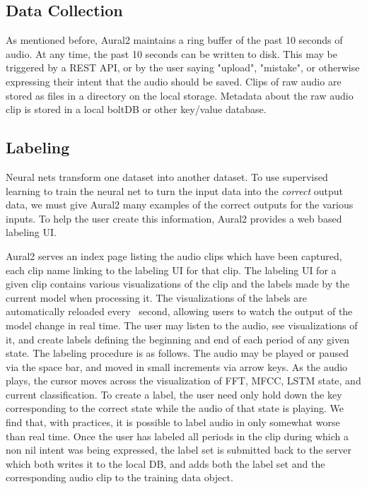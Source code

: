 \documentclass[conference]{IEEEtran}
\begin{document}
\subsection{Data Collection}

As mentioned before, Aural2 maintains a ring buffer of the past 10 seconds of audio. At any time, the past 10 seconds can be written to disk.
This may be triggered by a REST API, or by the user saying "upload", "mistake", or otherwise expressing their intent that the audio should be saved.
Clips of raw audio are stored as files in a directory on the local storage.
Metadata about the raw audio clip is stored in a local boltDB or other key/value database.

\subsection{Labeling}
Neural nets transform one dataset into another dataset. To use
supervised learning to train the neural net to turn the input data into
the \textit{correct} output data, we must give Aural2 many examples of the
correct outputs for the various inputs. To help the user create this
information, Aural2 provides a web based labeling UI.

Aural2 serves an index page listing the audio clips which have been captured, each clip name linking to the labeling UI for that clip.
The labeling UI for a given clip contains various visualizations of the clip and the labels made by the current model when processing it.
The visualizations of the labels are automatically reloaded every ~second, allowing users to watch the output of the model change in real time.
The user may listen to the audio, see visualizations of it, and create labels defining the beginning and end of each period of any given state.
The labeling procedure is as follows.
The audio may be played or paused via the space bar, and moved in small increments via arrow keys.
As the audio plays, the cursor moves across the visualization of FFT, MFCC, LSTM state, and current classification.
To create a label, the user need only hold down the key corresponding to the correct state while the audio of that state is playing.
We find that, with practices, it is possible to label audio in only somewhat worse than real time.
Once the user has labeled all periods in the clip during which a non nil intent was being expressed,
the label set is submitted back to the server which both writes it to the local DB,
and adds both the label set and the corresponding audio clip to the training data object.
\end{document}
